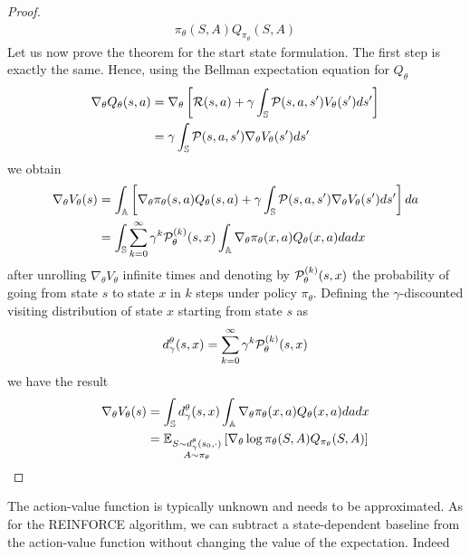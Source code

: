 \begin{proof}
\begin{equation*}
\begin{split}
{				\pi_\theta(S,A) Q_{\pi_\theta}(S, A)} 
		\end{split}
	\end{equation*}
	Let us now prove the theorem for the start state formulation. The first step is exactly the same. Hence, using the Bellman expectation equation for $Q_\theta$ 
	\begin{equation*}
		\begin{split}
			\nabla_\theta Q_\theta(s,a) &= \nabla_\theta \left[ \calR(s,a) + \gamma \int_{\S} \calP(s,a,s') V_\theta(s') ds' \right]\\ 
			&= \gamma \int_{\S} \calP(s,a,s') \nabla_\theta V_\theta(s') ds'
		\end{split}
	\end{equation*}
	we obtain
	\begin{equation*}
		\begin{split}
			\nabla_\theta V_\theta(s) &= \int_{\A} \left[ \nabla_\theta \pi_\theta(s,a) Q_\theta(s,a) + \gamma \int_{\S} \calP(s,a,s') \nabla_\theta V_\theta(s') ds' \right] da\\
			&= \int_\S  \sum_{k=0}^{\infty} \gamma^k \calP_\theta^{(k)}(s, x) \int_{\A} \nabla_\theta \pi_\theta(x,a) Q_\theta(x,a) da dx 
		\end{split}
	\end{equation*} 
	after unrolling $\nabla_\theta V_\theta$ infinite times and denoting by $\calP_\theta^{(k)}(s, x)$ the probability of going from state $s$ to state $x$ in $k$ steps under policy $\pi_\theta$.
	Defining the $\gamma$-discounted visiting distribution of state $x$ starting from state $s$ as
	\begin{equation*}
		d_\gamma^\theta(s, x) = \sum_{k=0}^{\infty} \gamma^k \calP_\theta^{(k)}(s, x)
	\end{equation*}
	we have the result
	\begin{equation*}
		\begin{split}
			\nabla_\theta V_\theta(s) &= \int_\S d_\gamma^\theta(s, x) \int_{\A} \nabla_\theta \pi_\theta(x,a) Q_\theta(x,a) da dx\\
			&= \E[\substack{S \sim d_\gamma^\theta(s_0, \cdot)\\A \sim \pi_\theta}]{\nabla_\theta\log \pi_\theta(S,A) Q_{\pi_\theta}(S, A)}
		\end{split}
	\end{equation*} 
\end{proof}
The action-value function is typically unknown and needs to be approximated. 
As for the REINFORCE algorithm, we can subtract a state-dependent baseline from the action-value function without changing the value of the expectation. Indeed 
